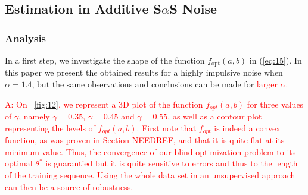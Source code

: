 \documentclass[a4paper]{IEEEtran}
\begin{document}
\subsection{Estimation in Additive S$\alpha$S Noise}


\subsubsection{Analysis}

In a first step, we investigate the shape of the function
$f_{\text{opt}}(a, b)$ in (\ref{eq:15}). In this paper we
present the obtained results for a highly impulsive noise
when $\alpha=1.4$, but the same observations and conclusions
can be made for \textcolor{red}{larger $\alpha$.}

\textcolor{red}{A: On \figurename~\ref{fig:12}, we represent
  a 3D plot of the function $f_{opt}(a,b)$ for three values
  of $\gamma$, namely $\gamma=0.35$, $\gamma=0.45$ and
  $\gamma=0.55$, as well as a contour plot representing the
  levels of $f_{opt}(a,b)$. First note that $f_{opt}$ is
  indeed a convex function, as was proven in Section
  NEEDREF, and that it is quite flat at its minimum value.
  Thus, the convergence of our blind optimization problem to
  its optimal $\theta^*$ is guarantied but it is quite
  sensitive to errors and thus to the length of the training
  sequence. Using the whole data set in an unsupervised
  approach can then be a source of robustness.}
\end{document}
